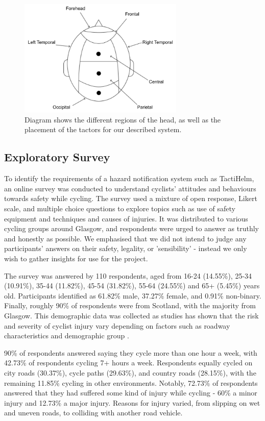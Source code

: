\documentclass{interim}
\begin{document}
\begin{figure}[!ht]
    \centering
    \includegraphics[width=0.70\textwidth]{images/head-regions.pdf}
    \caption{Diagram shows the different regions of the head, as well as the placement of the tactors for our described system.}
    \label{fig:head-regions}
\end{figure}


\subsection{Exploratory Survey}\label{sec:survey}
To identify the requirements of a hazard notification system such as TactiHelm, an online survey was conducted to understand cyclists' attitudes and behaviours towards safety while cycling. The survey used a mixture of open response, Likert scale, and multiple choice questions to explore topics such as use of safety equipment and techniques and causes of injuries. It was distributed to various cycling groups around Glasgow, and respondents were urged to answer as truthly and honestly as possible. We emphasised that we did not intend to judge any participants' answers on their safety, legality, or 'sensibility' - instead we only wish to gather insights for use for the project.

The survey was answered by 110 respondents, aged from 16-24 (14.55\%), 25-34 (10.91\%), 35-44 (11.82\%), 45-54 (31.82\%), 55-64 (24.55\%) and 65+ (5.45\%) years old. Participants identified as 61.82\% male, 37.27\% female, and 0.91\% non-binary. Finally, roughly 90\% of respondents were from Scotland, with the majority from Glasgow. This demographic data was collected as studies has shown that the risk and severity of cyclist injury vary depending on factors such as roadway characteristics and demographic group \cite{BEHNOOD201735}.

90\% of respondents answered saying they cycle more than one hour a week, with 42.73\% of respondents cycling 7+ hours a week. Respondents equally cycled on city roads (30.37\%), cycle paths (29.63\%), and country roads (28.15\%), with the remaining 11.85\% cycling in other environments. Notably, 72.73\% of respondents answered that they had suffered some kind of injury while cycling - 60\% a minor injury and 12.73\% a major injury. Reasons for injury varied, from slipping on wet and uneven roads, to colliding with another road vehicle.
\end{document}

